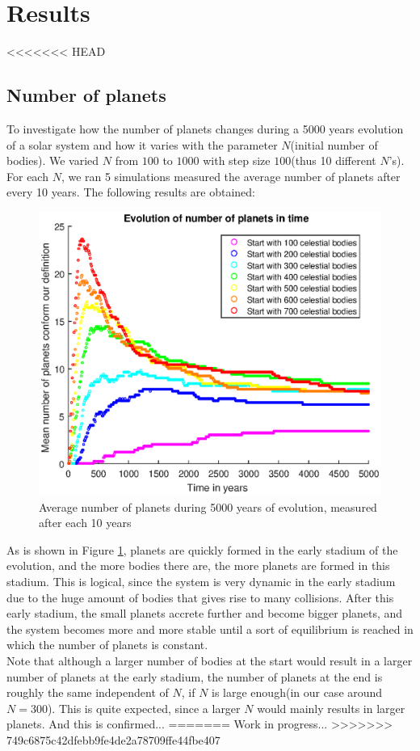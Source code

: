 \section{Results}
<<<<<<< HEAD
\subsection{Number of planets}
To investigate how the number of planets changes during a 5000 years evolution of a solar system and how it varies with the parameter $N$(initial number of bodies). We varied $N$ from $100$ to $1000$ with step size $100$(thus 10 different $N$'s). For each $N$, we ran 5 simulations measured the average number of planets after every 10 years. The following results are obtained:\\ 
\begin{figure}[H]
\centering
\includegraphics[scale=0.8]{AantPlaneten.eps}
\caption{Average number of planets during 5000 years of evolution, measured after each 10 years}
    \label{fig:AantPlaneten}
\end{figure}
As is shown in Figure \ref{fig:AantPlaneten}, planets are quickly formed in the early stadium of the evolution, and the more bodies there are, the more planets are formed in this stadium. This is logical, since the system is very dynamic in the early stadium due to the huge amount of bodies that gives rise to many collisions. After this early stadium, the small planets accrete further and become bigger planets, and the system becomes more and more stable until a sort of equilibrium is reached in which the number of planets is constant.\\

Note that although a larger number of bodies at the start would result in a larger number of planets at the early stadium, the number of planets at the end is roughly the same independent of $N$, if $N$ is large enough(in our case around $N=300$). This is quite expected, since a larger $N$ would mainly results in larger planets. And this is confirmed...
=======
Work in progress...
>>>>>>> 749c6875c42dfebb9fe4de2a78709ffe44fbe407
